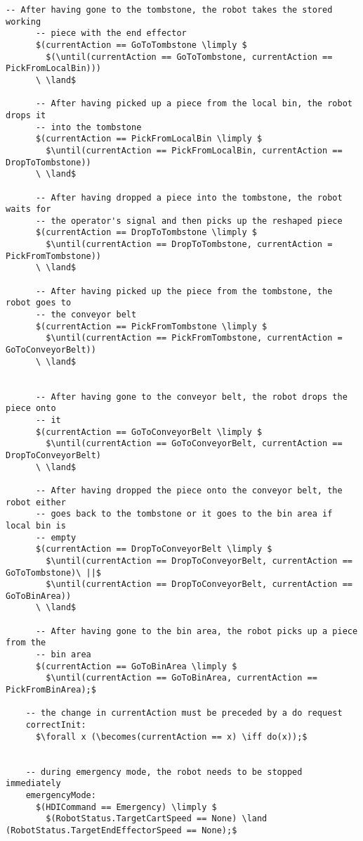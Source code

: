 \begin{lstlisting}[fontadjust, mathescape, frame=single]
      -- After having gone to the tombstone, the robot takes the stored working 
      -- piece with the end effector
      $(currentAction == GoToTombstone \limply $
        $(\until(currentAction == GoToTombstone, currentAction == PickFromLocalBin)))
      \ \land$

      -- After having picked up a piece from the local bin, the robot drops it 
      -- into the tombstone
      $(currentAction == PickFromLocalBin \limply $
        $\until(currentAction == PickFromLocalBin, currentAction == DropToTombstone))
      \ \land$

      -- After having dropped a piece into the tombstone, the robot waits for  
      -- the operator's signal and then picks up the reshaped piece
      $(currentAction == DropToTombstone \limply $ 
        $\until(currentAction == DropToTombstone, currentAction = PickFromTombstone))
      \ \land$

      -- After having picked up the piece from the tombstone, the robot goes to
      -- the conveyor belt
      $(currentAction == PickFromTombstone \limply $
        $\until(currentAction == PickFromTombstone, currentAction = GoToConveyorBelt))
      \ \land$


      -- After having gone to the conveyor belt, the robot drops the piece onto
      -- it
      $(currentAction == GoToConveyorBelt \limply $
        $\until(currentAction == GoToConveyorBelt, currentAction == DropToConveyorBelt)
      \ \land$

      -- After having dropped the piece onto the conveyor belt, the robot either 
      -- goes back to the tombstone or it goes to the bin area if local bin is 
      -- empty
      $(currentAction == DropToConveyorBelt \limply $
        $\until(currentAction == DropToConveyorBelt, currentAction == GoToTombstone)\ ||$
        $\until(currentAction == DropToConveyorBelt, currentAction == GoToBinArea))
      \ \land$

      -- After having gone to the bin area, the robot picks up a piece from the 
      -- bin area
      $(currentAction == GoToBinArea \limply $
        $\until(currentAction == GoToBinArea, currentAction == PickFromBinArea);$

    -- the change in currentAction must be preceded by a do request
    correctInit:
      $\forall x (\becomes(currentAction == x) \iff do(x));$

    
    -- during emergency mode, the robot needs to be stopped immediately
    emergencyMode:
      $(HDICommand == Emergency) \limply $
        $(RobotStatus.TargetCartSpeed == None) \land (RobotStatus.TargetEndEffectorSpeed == None);$


\end{lstlisting}
